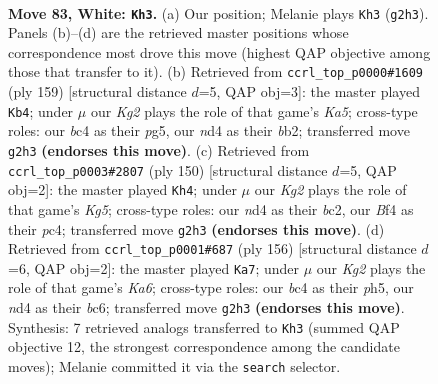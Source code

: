 \documentclass[11pt]{article}
\begin{document}
\clearpage

\begin{figure}[p]\centering
\begin{subfigure}{0.46\textwidth}\centering
\resizebox{\linewidth}{!}{%
\newchessgame
\chessboard[
  setfen={8/7k/8/8/2bn1B2/8/5PK1/8 w - - 11 83},
  showmover=false,
  pgfstyle=straightmove, color=movearrow, markmove={g2-h3}
]}
\caption{}
\end{subfigure}\hfill
\begin{subfigure}{0.46\textwidth}\centering
\resizebox{\linewidth}{!}{%
\newchessgame
\chessboard[
  setfen={8/8/6b1/3K2P1/k7/1p6/1B6/8 b - - 7 80},
  showmover=false,
  pgfstyle=straightmove, color=movearrow, markmove={a4-b4}
]}
\caption{}
\end{subfigure}
\\[4pt]
\begin{subfigure}{0.46\textwidth}\centering
\resizebox{\linewidth}{!}{%
\newchessgame
\chessboard[
  setfen={8/k7/7P/6K1/2p5/2B5/2b5/8 w - - 1 76},
  showmover=false,
  pgfstyle=straightmove, color=movearrow, markmove={g5-h4}
]}
\caption{}
\end{subfigure}\hfill
\begin{subfigure}{0.46\textwidth}\centering
\resizebox{\linewidth}{!}{%
\newchessgame
\chessboard[
  setfen={8/8/KPb5/7p/3k4/7B/8/8 w - - 4 79},
  showmover=false,
  pgfstyle=straightmove, color=movearrow, markmove={a6-a7}
]}
\caption{}
\end{subfigure}
\caption{\textbf{Move 83, White: \texttt{Kh3}.} (a) Our position; Melanie plays \texttt{Kh3} (\texttt{g2h3}). Panels (b)--(d) are the retrieved master positions whose correspondence most drove this move (highest QAP objective among those that transfer to it). (b) Retrieved from \texttt{ccrl\_top\_p0000\#1609} (ply 159) [structural distance $d$=5, QAP obj=3]: the master played \texttt{Kb4}; under $\mu$ our \emph{Kg2} plays the role of that game's \emph{Ka5}; cross-type roles: our \emph{b}c4 as their \emph{p}g5, our \emph{n}d4 as their \emph{b}b2; transferred move \texttt{g2h3} \textbf{(endorses this move)}. (c) Retrieved from \texttt{ccrl\_top\_p0003\#2807} (ply 150) [structural distance $d$=5, QAP obj=2]: the master played \texttt{Kh4}; under $\mu$ our \emph{Kg2} plays the role of that game's \emph{Kg5}; cross-type roles: our \emph{n}d4 as their \emph{b}c2, our \emph{B}f4 as their \emph{p}c4; transferred move \texttt{g2h3} \textbf{(endorses this move)}. (d) Retrieved from \texttt{ccrl\_top\_p0001\#687} (ply 156) [structural distance $d$=6, QAP obj=2]: the master played \texttt{Ka7}; under $\mu$ our \emph{Kg2} plays the role of that game's \emph{Ka6}; cross-type roles: our \emph{b}c4 as their \emph{p}h5, our \emph{n}d4 as their \emph{b}c6; transferred move \texttt{g2h3} \textbf{(endorses this move)}. Synthesis: 7 retrieved analogs transferred to \texttt{Kh3} (summed QAP objective 12, the strongest correspondence among the candidate moves); Melanie committed it via the \texttt{search} selector.}
\label{fig:thought-m164}
\end{figure}
\end{document}
